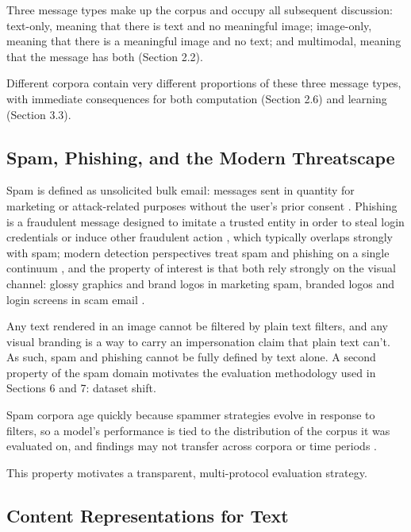 \documentclass[10pt,twoside]{article}
\begin{document}
Three message types make up the corpus and occupy all subsequent discussion: text-only, meaning that there is text and no meaningful image; image-only, meaning that there is a meaningful image and no text; and multimodal, meaning that the message has both (Section 2.2).

Different corpora contain very different proportions of these three message types, with immediate consequences for both computation (Section 2.6) and learning (Section 3.3).

\subsection{Spam, Phishing, and the Modern Threatscape}\label{sec:2.2}

Spam is defined as unsolicited bulk email: messages sent in quantity for marketing or attack-related purposes without the user's prior consent \citep{janez2023review}. Phishing is a fraudulent message designed to imitate a trusted entity in order to steal login credentials or induce other fraudulent action \citep{kyaw2024phishing}, which typically overlaps strongly with spam; modern detection perspectives treat spam and phishing on a single continuum \citep{kyaw2024phishing}, and the property of interest is that both rely strongly on the visual channel: glossy graphics and brand logos in marketing spam, branded logos and login screens in scam email \citep{annadatha2018image}.

Any text rendered in an image cannot be filtered by plain text filters, and any visual branding is a way to carry an impersonation claim that plain text can't. As such, spam and phishing cannot be fully defined by text alone. A second property of the spam domain motivates the evaluation methodology used in Sections 6 and 7: dataset shift.

Spam corpora age quickly because spammer strategies evolve in response to filters, so a model's performance is tied to the distribution of the corpus it was evaluated on, and findings may not transfer across corpora or time periods \citep{janez2023review}.

This property motivates a transparent, multi-protocol evaluation strategy.

\subsection{Content Representations for Text}\label{sec:2.3}
\end{document}
